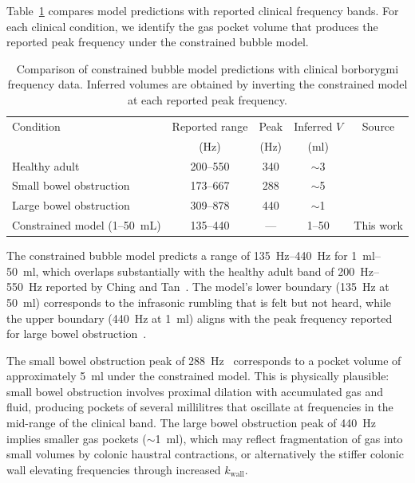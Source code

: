 \documentclass[12pt]{article}
\begin{document}
Table~\ref{tab:clinical} compares model predictions with reported clinical
frequency bands.  For each clinical condition, we identify the gas pocket
volume that produces the reported peak frequency under the constrained bubble
model.

\begin{table}[t]
\centering
\caption{Comparison of constrained bubble model predictions with clinical
  borborygmi frequency data.  Inferred volumes are obtained by inverting the
  constrained model at each reported peak frequency.}
\label{tab:clinical}
\begin{tabular}{lcccc}
\toprule
Condition & Reported range & Peak & Inferred $V$ & Source \\
 & (\si{\hertz}) & (\si{\hertz}) & (\si{\milli\litre}) & \\
\midrule
Healthy adult & 200--550 & 340 & $\sim$3 & \cite{Ching2012} \\
Small bowel obstruction & 173--667 & 288 & $\sim$5 & \cite{Yoshino1990} \\
Large bowel obstruction & 309--878 & 440 & $\sim$1 & \cite{DuPlessis2000} \\
\midrule
Constrained model (1--50~mL) & 135--440 & --- & 1--50 & This work \\
\bottomrule
\end{tabular}
\end{table}

The constrained bubble model predicts a range of
\SIrange{135}{440}{\hertz} for \SIrange{1}{50}{\milli\litre}, which
overlaps substantially with the healthy adult band of
\SIrange{200}{550}{\hertz} reported by Ching and Tan~\cite{Ching2012}.
The model's lower boundary (\SI{135}{\hertz} at \SI{50}{\milli\litre})
corresponds to the infrasonic rumbling that is felt but not heard, while the
upper boundary (\SI{440}{\hertz} at \SI{1}{\milli\litre}) aligns with the
peak frequency reported for large bowel obstruction~\cite{DuPlessis2000}.

The small bowel obstruction peak of \SI{288}{\hertz}~\cite{Yoshino1990}
corresponds to a pocket volume of approximately \SI{5}{\milli\litre} under
the constrained model.  This is physically plausible: small bowel obstruction
involves proximal dilation with accumulated gas and fluid, producing pockets
of several millilitres that oscillate at frequencies in the mid-range of the
clinical band.  The large bowel obstruction peak of
\SI{440}{\hertz}~\cite{DuPlessis2000} implies smaller gas pockets
($\sim$\SI{1}{\milli\litre}), which may reflect fragmentation of gas into
small volumes by colonic haustral contractions, or alternatively the stiffer
colonic wall elevating frequencies through increased $k_\mathrm{wall}$.
\end{document}
